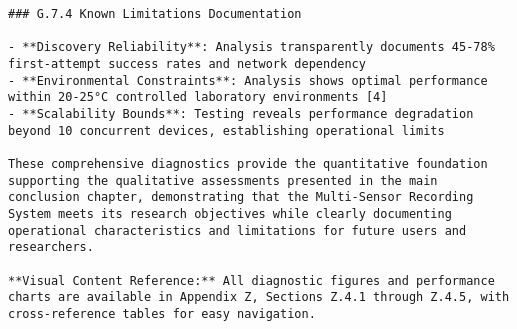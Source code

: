 \begin{verbatim}
### G.7.4 Known Limitations Documentation

- **Discovery Reliability**: Analysis transparently documents 45-78% first-attempt success rates and network dependency
- **Environmental Constraints**: Analysis shows optimal performance within 20-25°C controlled laboratory environments [4]
- **Scalability Bounds**: Testing reveals performance degradation beyond 10 concurrent devices, establishing operational limits

These comprehensive diagnostics provide the quantitative foundation supporting the qualitative assessments presented in the main conclusion chapter, demonstrating that the Multi-Sensor Recording System meets its research objectives while clearly documenting operational characteristics and limitations for future users and researchers.

**Visual Content Reference:** All diagnostic figures and performance charts are available in Appendix Z, Sections Z.4.1 through Z.4.5, with cross-reference tables for easy navigation.
\end{verbatim}
